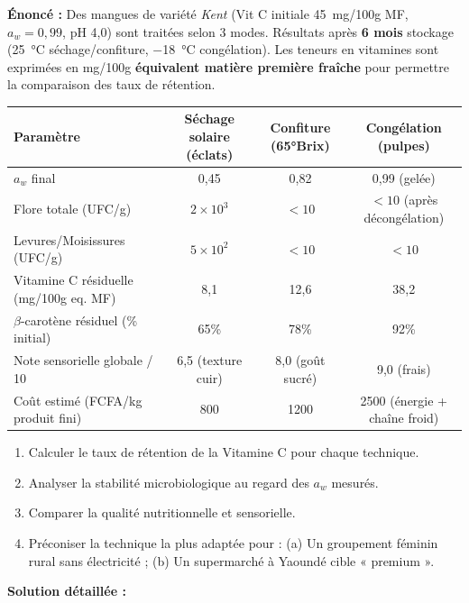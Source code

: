 \documentclass[11pt]{article}
\begin{document}
\begin{exoresolu}
    \textbf{Énoncé :} Des mangues de variété \emph{Kent} (Vit C initiale \SI{45}{mg/100g} MF, $a_w=0,99$, pH 4,0) sont traitées selon 3 modes. Résultats après \textbf{6 mois} stockage (\SI{25}{\celsius} séchage/confiture, \SI{-18}{\celsius} congélation). Les teneurs en vitamines sont exprimées en mg/100g \textbf{équivalent matière première fraîche} pour permettre la comparaison des taux de rétention.
    \begin{center}
        \begin{tabular}{|l|c|c|c|}\hline
        \textbf{Paramètre} & \textbf{Séchage solaire (éclats)} & \textbf{Confiture (65°Brix)} & \textbf{Congélation (pulpes)} \\ \hline
        $a_w$ final & 0,45 & 0,82 & 0,99 (gelée) \\ \hline
        Flore totale (UFC/g) & $2 \times 10^3$ & $< 10$ & $< 10$ (après décongélation) \\ \hline
        Levures/Moisissures (UFC/g) & $5 \times 10^2$ & $< 10$ & $< 10$ \\ \hline
        Vitamine C résiduelle (mg/100g eq. MF) & 8,1 & 12,6 & 38,2 \\ \hline
        $\beta$-carotène résiduel (\% initial) & 65\% & 78\% & 92\% \\ \hline
        Note sensorielle globale / 10 & 6,5 (texture cuir) & 8,0 (goût sucré) & 9,0 (frais) \\ \hline
        Coût estimé (FCFA/kg produit fini) & 800 & 1200 & 2500 (énergie + chaîne froid) \\ \hline
        \end{tabular}
    \end{center}
    \begin{enumerate}
        \item Calculer le taux de rétention de la Vitamine C pour chaque technique.
        \item Analyser la stabilité microbiologique au regard des $a_w$ mesurés.
        \item Comparer la qualité nutritionnelle et sensorielle.
        \item Préconiser la technique la plus adaptée pour : (a) Un groupement féminin rural sans électricité ; (b) Un supermarché à Yaoundé cible « premium ».
    \end{enumerate}
    \tcblower
    \textbf{Solution détaillée :}
    \begin{enumerate}

\end{enumerate}
\end{exoresolu}
\end{document}
